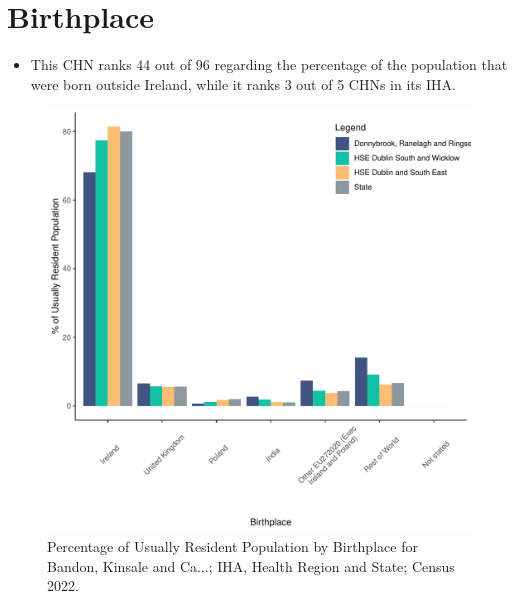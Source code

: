 \documentclass{article}
\begin{document}
\section{Birthplace}\label{sect:Birth}
\begin{itemize}
\item This CHN ranks  44 out of 96 regarding the percentage of the population that were born outside Ireland, while it ranks  3 out of 5 CHNs in its IHA.
\end{itemize}
\begin{figure}[H]
	\centering
	\includegraphics[width = 130mm]{../figures/BirthED.pdf}
	\caption{Percentage of Usually Resident Population by Birthplace for Bandon, Kinsale and Ca...; IHA, Health Region and State; Census 2022.}
	\label{fig:vbnv}
	\end{figure}
	
\end{document}
